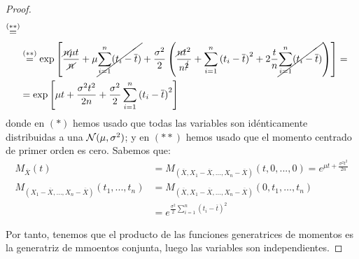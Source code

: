 \begin{prop}
\begin{proof}
\begin{align*}
            \stackrel{(\ast\ast)}{=}\\&\stackrel{(\ast\ast)}{=} \exp\left[\frac{\cancel{n}\mu t}{\cancel{n}} + \mu \cancel{\sum\limits_{i=1}^n (t_i - \overline{t})} + \frac{\sigma^2}{2} \left(\frac{\cancel{n}t^2}{n^{\cancel{2}}} + \sum\limits_{i=1}^n {(t_i - \overline{t})}^{2} + 2\frac{t}{n}\cancel{\sum\limits_{i=1}^n (t_i - \overline{t})}\right)\right]
            =\\&= \exp\left[\mu t + \frac{\sigma^2t^2}{2n} + \frac{\sigma^2}{2}\sum\limits_{i=1}^n {(t_i - \overline{t})}^2{}\right]
        \end{align*}
        donde en $(\ast)$ hemos usado que todas las variables son idénticamente distribuidas a una $\mathcal{N}(\mu, \sigma^2)$; y en $(\ast\ast)$ hemos usado que el momento centrado de primer orden es cero.
        Sabemos que:
        \begin{align*}
            M_{\overline{X}}(t) &= M_{\left(\overline{X},X_1 - \overline{X}, \ldots, X_n - \overline{X}\right)}(t,0, ..., 0) = e^{\mu t + \frac{\sigma^2t^2}{2n}} \\
            M_{(X_1 - \overline{X}, \ldots, X_n - \overline{X})}(t_1, ..., t_n) &= M_{(\overline{X},X_1 - \overline{X}, \ldots, X_n - \overline{X})}(0,t_1, \ldots, t_n) \\
                                &= e^{\frac{\sigma^2}{2}\sum\limits_{i=1}^n {(t_i - \overline{t})}^{2}}
        \end{align*}

        Por tanto, tenemos que el producto de las funciones generatrices de momentos es la generatriz de mmoentos conjunta, luego las variables son independientes.
    \end{proof}
\end{prop}

